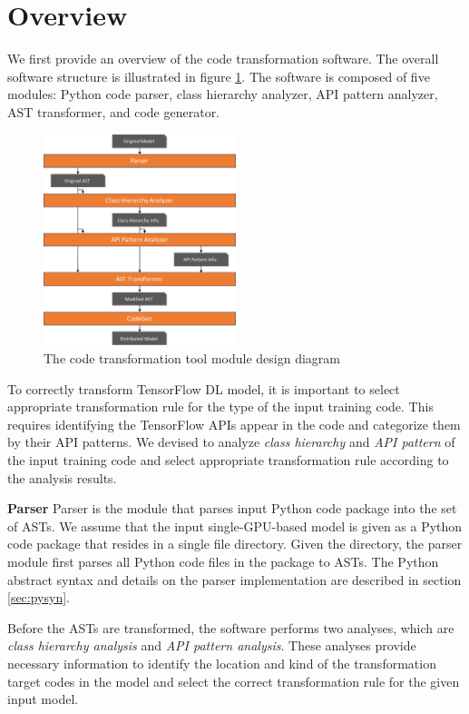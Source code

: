 \section{Overview}

We first provide an overview of the code transformation software.
The overall software structure is illustrated in figure \ref{sysarch}.
The software is composed of five modules: Python code parser,
class hierarchy analyzer, API pattern analyzer, AST transformer,
and code generator.

\begin{figure}[ht!]
  \centering
  \includegraphics[width=0.5\textwidth]{tool-arch.pdf}
  \caption{The code transformation tool module design diagram}
  \label{sysarch}
\end{figure}

To correctly transform TensorFlow DL model, it is important to select
appropriate transformation rule for the type of the input training code.
This requires identifying the TensorFlow APIs appear in the code and
categorize them by their API patterns.
We devised to analyze \textit{class hierarchy} and \textit{API pattern} 
of the input training code and select appropriate transformation rule 
according to the analysis results. 

\textbf{Parser}
Parser is the module that parses input Python code package
into the set of ASTs.
We assume that the input single-GPU-based model is given as a Python code
package that resides in a single file directory.
Given the directory, the parser module first parses all Python code files
in the package to ASTs.
The Python abstract syntax and details on the parser implementation
are described in section \ref{sec:pysyn}.

Before the ASTs are transformed, the software performs two analyses, 
which are \textit{class hierarchy analysis} and 
\textit{API pattern analysis}.
These analyses provide necessary information to identify the
location and kind of the transformation target codes in the model
and select the correct transformation rule for the given input model.

